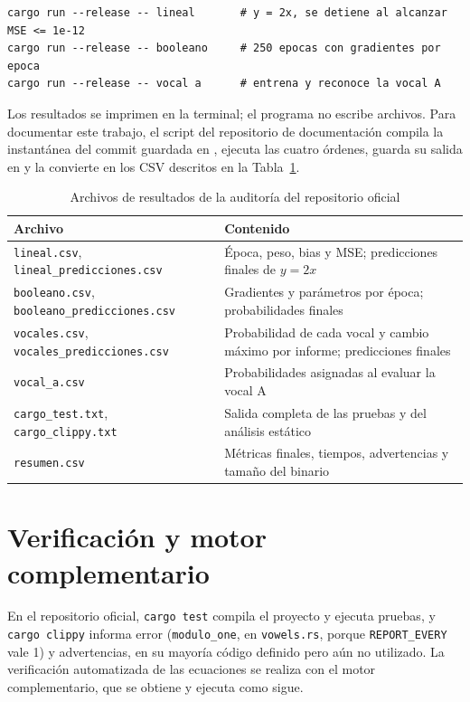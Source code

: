 \begin{lstlisting}[language={},numbers=none,caption={Ejemplos de ejecución del repositorio oficial},label=cod:ejecucion]
cargo run --release -- lineal       # y = 2x, se detiene al alcanzar MSE <= 1e-12
cargo run --release -- booleano     # 250 epocas con gradientes por epoca
cargo run --release -- vocal a      # entrena y reconoce la vocal A
\end{lstlisting}

Los resultados se imprimen en la terminal; el programa no escribe archivos. Para documentar este trabajo, el script  del repositorio de documentación compila la instantánea del commit \texttt{\OfCommit} guardada en , ejecuta las cuatro órdenes, guarda su salida en  y la convierte en los CSV descritos en la Tabla~\ref{tab:csv}.

\begin{table}[!htbp]
\caption{Archivos de resultados de la auditoría del repositorio oficial}\label{tab:csv}
\small
\begin{tabularx}{\textwidth}{@{}l >{\raggedright\arraybackslash}X@{}}
\toprule
Archivo & Contenido \\
\midrule
\texttt{lineal.csv}, \texttt{lineal\_predicciones.csv} & Época, peso, bias y MSE; predicciones finales de $y=2x$ \\
\texttt{booleano.csv}, \texttt{booleano\_predicciones.csv} & Gradientes y parámetros por época; probabilidades finales \\
\texttt{vocales.csv}, \texttt{vocales\_predicciones.csv} & Probabilidad de cada vocal y cambio máximo por informe; predicciones finales \\
\texttt{vocal\_a.csv} & Probabilidades asignadas al evaluar la vocal A \\
\texttt{cargo\_test.txt}, \texttt{cargo\_clippy.txt} & Salida completa de las pruebas y del análisis estático \\
\texttt{resumen.csv} & Métricas finales, tiempos, advertencias y tamaño del binario \\
\bottomrule
\end{tabularx}
\end{table}

\section{Verificación y motor complementario}
En el repositorio oficial, \texttt{cargo test} compila el proyecto y ejecuta \OfPruebas{} pruebas, y \texttt{cargo clippy} informa \OfClippyErr{} error (\texttt{modulo\_one}, en \texttt{vowels.rs}, porque \texttt{REPORT\_EVERY} vale 1) y \OfClippyWarn{} advertencias, en su mayoría código definido pero aún no utilizado. La verificación automatizada de las ecuaciones se realiza con el motor complementario, que se obtiene y ejecuta como sigue.

